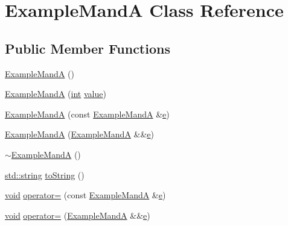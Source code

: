 \hypertarget{class_example_mand_a}{}\section{Example\+MandA Class Reference}
\label{class_example_mand_a}
\subsection*{Public Member Functions}
\begin{DoxyCompactItemize}
\item 
\mbox{\hyperlink{class_example_mand_a_a0cb8381fd54c3e1ae7a1143a8c7a047a}{Example\+MandA}} ()
\item 
\mbox{\hyperlink{class_example_mand_a_ad0f8112ebdf7dfa31793873c0e815067}{Example\+MandA}} (\mbox{\hyperlink{warnings_8h_a74f207b5aa4ba51c3a2ad59b219a423b}{int}} \mbox{\hyperlink{_s_d_l__opengl__glext_8h_a8ad81492d410ff2ac11f754f4042150f}{value}})
\item 
\mbox{\hyperlink{class_example_mand_a_aed936e6a6628665e06afe10c62468250}{Example\+MandA}} (const \mbox{\hyperlink{class_example_mand_a}{Example\+MandA}} \&\mbox{\hyperlink{longobject_8h_a28cf183ea1588229c01af441267bc98c}{e}})
\item 
\mbox{\hyperlink{class_example_mand_a_a5fbfd0d9811af734cfda8ae9edcff001}{Example\+MandA}} (\mbox{\hyperlink{class_example_mand_a}{Example\+MandA}} \&\&\mbox{\hyperlink{longobject_8h_a28cf183ea1588229c01af441267bc98c}{e}})
\item 
\mbox{\hyperlink{class_example_mand_a_aa2014dcdc043beb54d4b35d2d69b67a2}{$\sim$\+Example\+MandA}} ()
\item 
\mbox{\hyperlink{_s_d_l__opengl__glext_8h_ab4ccfaa8ab0e1afaae94dc96ef52dde1}{std\+::string}} \mbox{\hyperlink{class_example_mand_a_afaf84cdf0e7ea78e0dbac31f2f26feb4}{to\+String}} ()
\item 
\mbox{\hyperlink{_s_d_l__opengles2__gl2ext_8h_ae5d8fa23ad07c48bb609509eae494c95}{void}} \mbox{\hyperlink{class_example_mand_a_a16a516ceed6da440c47661dd71b32aec}{operator=}} (const \mbox{\hyperlink{class_example_mand_a}{Example\+MandA}} \&\mbox{\hyperlink{longobject_8h_a28cf183ea1588229c01af441267bc98c}{e}})
\item 
\mbox{\hyperlink{_s_d_l__opengles2__gl2ext_8h_ae5d8fa23ad07c48bb609509eae494c95}{void}} \mbox{\hyperlink{class_example_mand_a_a5b43a94a480dc2a4f2e6748491c00679}{operator=}} (\mbox{\hyperlink{class_example_mand_a}{Example\+MandA}} \&\&\mbox{\hyperlink{longobject_8h_a28cf183ea1588229c01af441267bc98c}{e}})

\end{DoxyCompactItemize}
